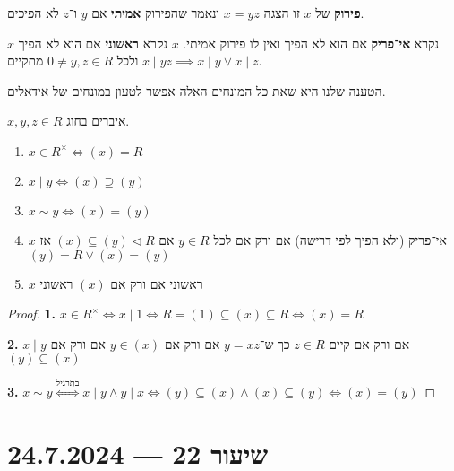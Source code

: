 \begin{definition}[פירוק]
	\textbf{פירוק} של $x$ זו הצגה $x = yz$ ונאמר שהפירוק \textbf{אמיתי} אם $y$ ו־$z$ לא הפיכים.
\end{definition}
\begin{definition}
	$x$ נקרא \textbf{אי־פריק} אם הוא לא הפיך ואין לו פירוק אמיתי.
	$x$ נקרא \textbf{ראשוני} אם הוא לא הפיך ולכל $0 \ne y, z \in R$ מתקיים $x \mid yz \implies x \mid y \lor x \mid z$.
\end{definition}
הטענה שלנו היא שאת כל המונחים האלה אפשר לטעון במונחים של אידאלים.
\begin{proposition}
	$x, y, z \in R$ איברים בחוג.
	\begin{enumerate}
		\item $x \in R^\times \iff (x) = R$
		\item $x \mid y \iff (x) \supseteq (y)$
		\item $x \sim y \iff (x) = (y)$
		\item $x$ אי־פריק (ולא הפיך לפי דרישה) אם ורק אם לכל $y \in R$ אם $(x) \subseteq (y) \triangleleft R$ אז $(y) = R \lor (x) = (y)$
		\item $x$ ראשוני אם ורק אם $(x)$ ראשוני
	\end{enumerate}
\end{proposition}
\begin{proof}
	\textbf{1.}
	$x \in R^\times \iff x \mid 1 \iff R = (1) \subseteq (x) \subseteq R \iff (x) = R$

	\textbf{2.}
	$x \mid y$ אם ורק אם קיים $z \in R$ כך ש־$y = xz$ אם ורק אם $y \in (x)$ אם ורק אם $(y) \subseteq (x)$

	\textbf{3.}
	$x \sim y \overset{\text{בתרגיל}}{\iff} x \mid y \land y \mid x \iff (y) \subseteq (x) \land (x) \subseteq (y) \iff (x) = (y)$
\end{proof}

\section{שיעור 22 --- 24.7.2024}
